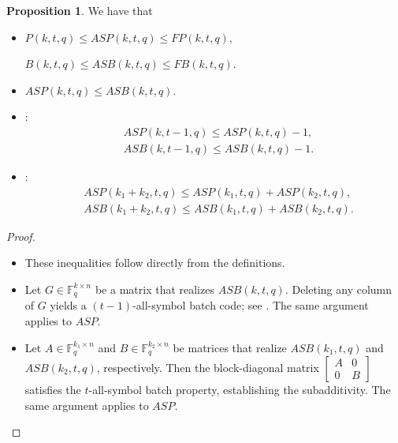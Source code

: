 \documentclass[11pt,a4paper]{article}
\theoremstyle{definition}
\newtheorem{proposition}[theorem]{Proposition}
\newcommand{\F}{\mathbb{F}}
\begin{document}
\begin{proposition}\label{prop:first}
    We have that
    
    \begin{itemize}
    \item[(i)] 
    \( P(k,t,q) \le ASP(k,t,q) \le FP(k,t,q) \),
    
    \( B(k,t,q) \le ASB(k,t,q) \le FB(k,t,q) \).

    \item[(ii)] 
    \( ASP(k,t,q) \le ASB(k,t,q) \).

    \item[(iii)] :  
    \begin{align*}
        &ASP(k,t-1,q) \le ASP(k,t,q) - 1, \\
        &ASB(k,t-1,q) \le ASB(k,t,q) - 1.
    \end{align*}


    \item[(iv)] :  
    \begin{align*}
        &ASP(k_1 + k_2, t, q) \le ASP(k_1, t, q) + ASP(k_2, t, q), \\
        &ASB(k_1 + k_2, t, q) \le ASB(k_1, t, q) + ASB(k_2, t, q).
    \end{align*}
\end{itemize}
\end{proposition}



    
\begin{proof} \text{ }
    \begin{itemize}
         \item[(i)+(ii)] 
    These inequalities follow directly from the definitions.
          \item[(iii)] Let $G\in \F_q^{k \times n}$ be a matrix that realizes $ASB(k,t,q)$. Deleting any column of $G$ yields a $(t-1)$-all-symbol batch code; see \cite[Theorem 2]{YAAKOBI2020}. The same argument applies to $ASP$.
          \item[(iv)] Let $A\in \F_q^{k_1 \times n}$ and $B\in \F_q^{k_2 \times n}$ be matrices that realize  $ASB(k_1,t,q)$ and $ASB(k_2,t,q)$, respectively. Then the block-diagonal matrix $ 
          \begin{bmatrix}
          A & 0\\
          0 & B
          \end{bmatrix}$
          satisfies the \(t\)-all-symbol batch property, establishing the subadditivity. The same argument applies to $ASP$.  \qedhere
    \end{itemize}
\end{proof}
\end{document}
